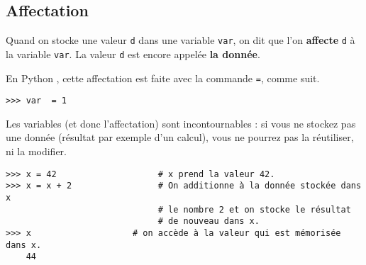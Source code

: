 %
%

\subsection{Affectation}

\begin{defi}[Affectation]
Quand on stocke une valeur \texttt{d} dans une variable \texttt{var}, on dit que l'on 
\textbf{affecte} \texttt{d} à la variable \texttt{var}. La valeur
\texttt{d} est encore appelée \textbf{la donnée}.
\end{defi}

En Python , cette affectation est faite avec la commande \lstinline{=}, comme suit.  

\begin{lstlisting}
>>> var  = 1
\end{lstlisting}


Les variables (et donc l'affectation) sont incontournables : si vous ne stockez pas une donnée 
(résultat par exemple d'un calcul), vous ne pourrez pas la réutiliser, ni la modifier.

\begin{lstlisting}
>>> x = 42                    # x prend la valeur 42.
>>> x = x + 2                 # On additionne à la donnée stockée dans x 
                              # le nombre 2 et on stocke le résultat  
                              # de nouveau dans x.
>>> x                    # on accède à la valeur qui est mémorisée dans x.
	44
\end{lstlisting}

